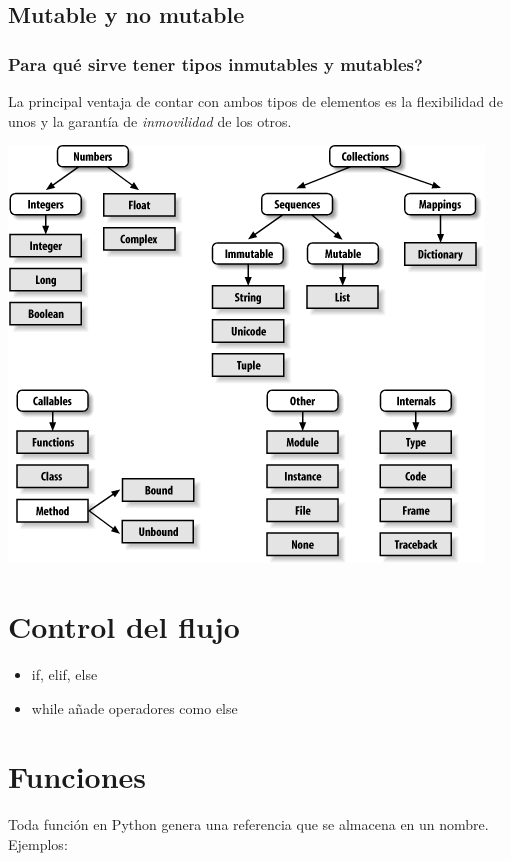 \documentclass{beamer}
\begin{document}
\subsection{Mutable y no mutable}
\begin{frame}
\frametitle{Para qué sirve tener tipos inmutables y mutables?}
La principal ventaja de contar con ambos tipos de elementos es la flexibilidad de unos y la garantía de \textit{inmovilidad} de los otros.
\begin{center}
\includegraphics[height=0.7\textheight]{tree.png}
\end{center}
\end{frame}

\section{Control del flujo}
\begin{frame}
\begin{itemize}
\item if, elif, else
\item while
	añade operadores como else
\end{itemize}
\end{frame}

\section{Funciones}
\begin{frame}
Toda función en Python genera una referencia que se almacena en un nombre. Ejemplos:
\end{frame}
\end{document}
